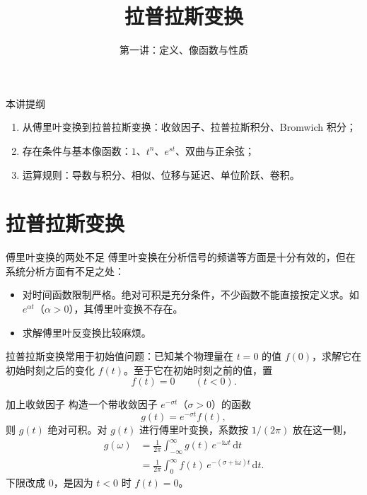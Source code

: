 \documentclass[fontset=windows, chinese, 10pt, xcolor=dvipsnames]{beamer}
\title{拉普拉斯变换}
\subtitle{第一讲：定义、像函数与性质}
\begin{document}
\begin{frame}
  \titlepage
\end{frame}

\begin{frame}{本讲提纲}
  \begin{enumerate}
    \item 从傅里叶变换到拉普拉斯变换：收敛因子、拉普拉斯积分、Bromwich 积分；
    \item 存在条件与基本像函数：$1$、$t^n$、$e^{st}$、双曲与正余弦；
    \item 运算规则：导数与积分、相似、位移与延迟、单位阶跃、卷积。
  \end{enumerate}
\end{frame}

\section{拉普拉斯变换}

\begin{frame}{傅里叶变换的两处不足}
  傅里叶变换在分析信号的频谱等方面是十分有效的，但在系统分析方面有不足之处：
  \begin{itemize}
    \item 对时间函数限制严格。绝对可积是充分条件，不少函数不能直接按定义求。如 $e^{\alpha t}$（$\alpha>0$），其傅里叶变换不存在。
    \item 求解傅里叶反变换比较麻烦。
  \end{itemize}
  拉普拉斯变换常用于初始值问题：已知某个物理量在 $t=0$ 的值 $f(0)$，求解它在初始时刻之后的变化 $f(t)$。至于它在初始时刻之前的值，置
  \begin{equation*}
    f(t)=0\qquad(t<0).
  \end{equation*}
\end{frame}

\begin{frame}{加上收敛因子}
  构造一个带收敛因子 $e^{-\sigma t}$（$\sigma>0$）的函数
  \begin{equation*}
    g(t)=e^{-\sigma t}f(t),
  \end{equation*}
  则 $g(t)$ 绝对可积。对 $g(t)$ 进行傅里叶变换，系数按 $1/(2\pi)$ 放在这一侧，
  \begin{align*}
    g(\omega)
    &=\frac{1}{2\pi}\int_{-\infty}^{\infty}
      g(t)\,e^{-\mathrm{i}\omega t}\,\mathrm{d}t \\
    &=\frac{1}{2\pi}\int_{0}^{\infty}
      f(t)\,e^{-(\sigma+\mathrm{i}\omega)t}\,\mathrm{d}t.
  \end{align*}
  下限改成 $0$，是因为 $t<0$ 时 $f(t)=0$。
\end{frame}
\end{document}
